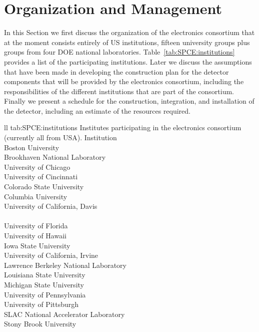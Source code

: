\section{Organization and Management}
\label{sec:fdsp-tpcelec-management}

In this Section we first discuss the organization of the  electronics
consortium that at the moment consists entirely of US institutions, 
fifteen university groups plus groups from four DOE national 
laboratories. Table~\ref{tab:SPCE:institutions} provides a list 
of the participating institutions.
Later we discuss the assumptions that have been made in developing
the construction plan for the detector components that will be
provided by the  electronics consortium, including the responsibilities
of the different institutions that are part of the consortium. Finally
we present a schedule for the construction, integration, and installation
of the detector, including an estimate of the resources required.

\begin{dunetable}
{ll}
{tab:SPCE:institutions}
{Institutes participating in the  electronics consortium (currently all from USA).}
Institution  \\ \toprowrule
Boston University \\ \colhline
Brookhaven National Laboratory \\ \colhline
University of Chicago \\ \colhline
University of Cincinnati \\ \colhline
Colorado State University  \\ \colhline
Columbia University \\ \colhline
University of California, Davis \\ \colhline
{} \\ \colhline
University of Florida \\ \colhline
University of Hawaii \\ \colhline
Iowa State University \\ \colhline
University of California, Irvine \\ \colhline
Lawrence Berkeley National Laboratory \\ \colhline
Louisiana State University \\ \colhline
Michigan State University \\ \colhline
University of Pennsylvania \\ \colhline
University of Pittsburgh \\ \colhline
SLAC National Accelerator Laboratory \\ \colhline
Stony Brook University \\
\end{dunetable}

